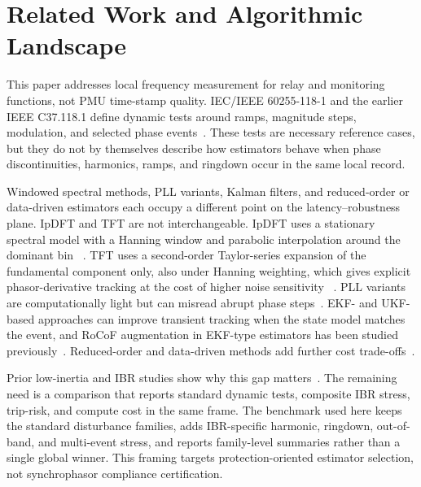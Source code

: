\section{Related Work and Algorithmic Landscape}
\label{sec:related}

This paper addresses local frequency measurement for relay and monitoring
functions, not PMU time-stamp quality. IEC/IEEE 60255-118-1 and the earlier
IEEE C37.118.1 define dynamic tests around ramps, magnitude steps, modulation,
and selected phase events~\cite{IEEE_C37_118,IEC_IEEE_60255_118_1_2018}. These
tests are necessary reference cases, but they do not by themselves describe
how estimators behave when phase discontinuities, harmonics, ramps, and
ringdown occur in the same local record.

Windowed spectral methods, PLL variants, Kalman filters, and reduced-order or
data-driven estimators each occupy a different point on the latency--robustness
plane. IpDFT and TFT are not interchangeable. IpDFT uses a stationary spectral
model with a Hanning window and parabolic interpolation around the dominant bin
~\cite{Belega2014}. TFT uses a second-order Taylor-series expansion of the
fundamental component only, also under Hanning weighting, which gives explicit
phasor-derivative tracking at the cost of higher noise sensitivity
~\cite{PlatasGarza2011}.
PLL variants are computationally light but can misread abrupt phase
steps~\cite{Golestan2017,Wright2019}. EKF- and UKF-based approaches can improve
transient tracking when the state model matches the event, and RoCoF
augmentation in EKF-type estimators has been studied previously~\cite{Ferrero2020EKF,Chamorro2021}.
Reduced-order and data-driven methods add further cost trade-offs~\cite{Netto2018KoopmanKF,Ting2022}.

Prior low-inertia and IBR studies show why this gap matters~\cite{Milano2018LowInertia,Pinheiro2025,Ponce2025,Bernal2025,Zoghby2024}.
The remaining need is a comparison that reports standard dynamic tests,
composite IBR stress, trip-risk, and compute cost in the same frame. The
benchmark used here keeps the standard disturbance families, adds IBR-specific
harmonic, ringdown, out-of-band, and multi-event stress, and reports
family-level summaries rather than a single global winner. This framing
targets protection-oriented estimator selection, not synchrophasor compliance
certification.
